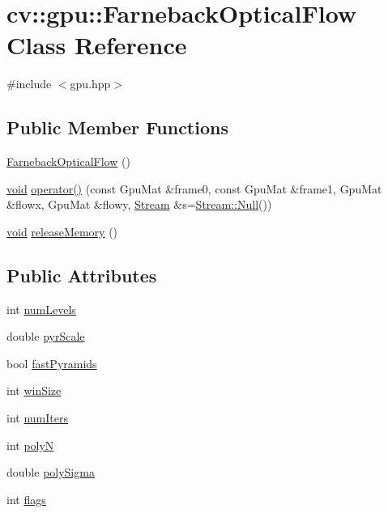 \hypertarget{classcv_1_1gpu_1_1FarnebackOpticalFlow}{\section{cv\-:\-:gpu\-:\-:Farneback\-Optical\-Flow Class Reference}
\label{classcv_1_1gpu_1_1FarnebackOpticalFlow}
}


{\ttfamily \#include $<$gpu.\-hpp$>$}

\subsection*{Public Member Functions}
\begin{DoxyCompactItemize}
\item 
\hyperlink{classcv_1_1gpu_1_1FarnebackOpticalFlow_aa1d5d3ff167c512d21c139dd349f6208}{Farneback\-Optical\-Flow} ()
\item 
\hyperlink{legacy_8hpp_a8bb47f092d473522721002c86c13b94e}{void} \hyperlink{classcv_1_1gpu_1_1FarnebackOpticalFlow_a8b98c5e029df769799e62f0b569c5649}{operator()} (const Gpu\-Mat \&frame0, const Gpu\-Mat \&frame1, Gpu\-Mat \&flowx, Gpu\-Mat \&flowy, \hyperlink{classcv_1_1gpu_1_1Stream}{Stream} \&s=\hyperlink{classcv_1_1gpu_1_1Stream_af96c23564834f88333dcb8997df553f1}{Stream\-::\-Null}())
\item 
\hyperlink{legacy_8hpp_a8bb47f092d473522721002c86c13b94e}{void} \hyperlink{classcv_1_1gpu_1_1FarnebackOpticalFlow_a7c3008d5a6e948b6a59b68888b3277bf}{release\-Memory} ()
\end{DoxyCompactItemize}
\subsection*{Public Attributes}
\begin{DoxyCompactItemize}
\item 
int \hyperlink{classcv_1_1gpu_1_1FarnebackOpticalFlow_a65e8ba26c07a9e492d39cab4b2a50ee8}{num\-Levels}
\item 
double \hyperlink{classcv_1_1gpu_1_1FarnebackOpticalFlow_afd28cb6ab5a507fe87f264e5e26ec2ea}{pyr\-Scale}
\item 
bool \hyperlink{classcv_1_1gpu_1_1FarnebackOpticalFlow_a65eba919aaaa05ef2af657b480a44f65}{fast\-Pyramids}
\item 
int \hyperlink{classcv_1_1gpu_1_1FarnebackOpticalFlow_a1d732b231fbb0ebdbb6533bd5f959c64}{win\-Size}
\item 
int \hyperlink{classcv_1_1gpu_1_1FarnebackOpticalFlow_a7626bd1a1fbe35004056512aa5e178b7}{num\-Iters}
\item 
int \hyperlink{classcv_1_1gpu_1_1FarnebackOpticalFlow_a95230f24301b3f53f318cb9052e068fd}{poly\-N}
\item 
double \hyperlink{classcv_1_1gpu_1_1FarnebackOpticalFlow_ae64754d971eec5984f3d8f43f60997a2}{poly\-Sigma}
\item 
int \hyperlink{classcv_1_1gpu_1_1FarnebackOpticalFlow_a65c45101360cdf9a161104d1ad165584}{flags}
\end{DoxyCompactItemize}



